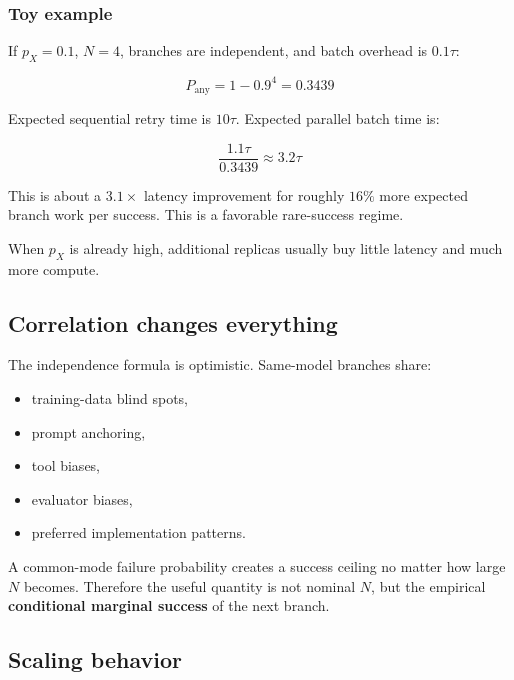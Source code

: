 \documentclass[
  letterpaper,
]{article}
\providecommand{\tightlist}{%
  \setlength{\itemsep}{0pt}\setlength{\parskip}{0pt}}
\begin{document}
\subsubsection{Toy example}\label{toy-example}

If \(p_X=0.1\), \(N=4\), branches are independent, and batch overhead is \(0.1\tau\):

\[
P_{\text{any}}=1-0.9^4=0.3439
\]

Expected sequential retry time is \(10\tau\). Expected parallel batch time is:

\[
\frac{1.1\tau}{0.3439}\approx3.2\tau
\]

This is about a \(3.1\times\) latency improvement for roughly \(16\%\) more expected branch work per success. This is a favorable rare-success regime.

When \(p_X\) is already high, additional replicas usually buy little latency and much more compute.

\subsection{Correlation changes everything}\label{correlation-changes-everything}

The independence formula is optimistic. Same-model branches share:

\begin{itemize}
\tightlist
\item
  training-data blind spots,
\item
  prompt anchoring,
\item
  tool biases,
\item
  evaluator biases,
\item
  preferred implementation patterns.
\end{itemize}

A common-mode failure probability creates a success ceiling no matter how large \(N\) becomes. Therefore the useful quantity is not nominal \(N\), but the empirical \textbf{conditional marginal success} of the next branch.

\subsection{Scaling behavior}\label{scaling-behavior}
\end{document}
